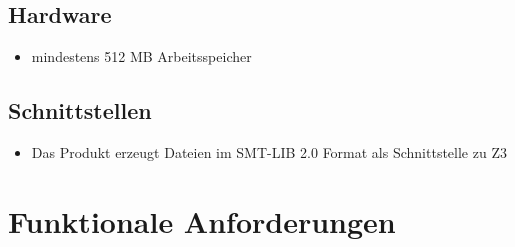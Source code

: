 \documentclass[a4paper,10pt]{article}
\begin{document}
\subsection{Hardware}
\begin{itemize}
  \item mindestens 512 MB Arbeitsspeicher
\end{itemize}

\subsection{Schnittstellen}
\begin{itemize}
  \item Das Produkt erzeugt Dateien im SMT-LIB 2.0 Format als Schnittstelle zu Z3
\end{itemize}

\section{Funktionale Anforderungen}
\end{document}
